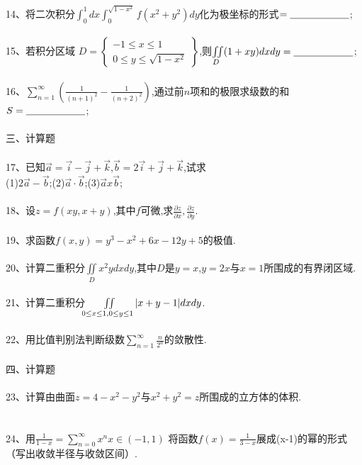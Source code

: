 \documentclass[12pt,a3paper]{article}
\begin{document}
\\\\
14、将二次积分$\int_0^1dx\int_0^{\sqrt{1-x^2}}f(x^2+y^2)dy$化为极坐标的形式$=\underline{\makebox[6em]{}}$;
\\\\
15、若积分区域
$D = \left.
\begin{cases}
  -1 \leq x \leq 1 \\
  0 \leq y \leq \sqrt{1-x^2}
\end{cases}
\right\}
$,则$\iint\limits_D (1+xy)dxdy=\underline{\makebox[6em]{}}$;
\\\\
16、$\sum\limits_{n=1}^\infty(\frac{1}{(n+1)^2}-\frac{1}{(n+2)^2})$,通过前$n$项和的极限求级数的和$S=\underline{\makebox[6em]{}}$;
\\\\
三、计算题
\\\\
17、已知$\vec{a}=\vec{i}-\vec{j}+\vec{k}$,$\vec{b}=2\vec{i}+\vec{j}+\vec{k}$,试求\\
(1)$2\vec{a}-\vec{b}$;(2)$\vec{a}\cdot\vec{b}$;(3)$\vec{a}x\vec{b}$;
\\\\
18、设$z=f(xy,x+y)$,其中$f$可微,求$\frac{\partial z}{\partial x}, \frac{\partial z}{\partial y}$.
\\\\
19、求函数$f(x,y)=y^3-x^2+6x-12y+5$的极值.
\\\\
20、计算二重积分$\iint\limits_D x^2ydxdy$,其中$D$是$y=x$,$y=2x$与$x=1$所围成的有界闭区域.
\\\\
21、计算二重积分$\iint\limits_{0\leq x\leq 1, \\0\leq y\leq 1}|x+y-1|dxdy$.
\\\\
22、用比值判别法判断级数$\sum\limits_{n=1}^\infty\frac{n}{2^n}$的敛散性.
\\\\
四、计算题
\\\\
23、计算由曲面$z=4-x^2-y^2$与$x^2+y^2=z$所围成的立方体的体积.
\\\\\\
24、用$\frac{1}{1-x}=\sum\limits_{n=0}^\infty x^n x\in (-1,1)$ 将函数$f(x)=\frac{1}{3-x}$展成(x-1)的幂的形式（写出收敛半径与收敛区间）.
\end{document}
